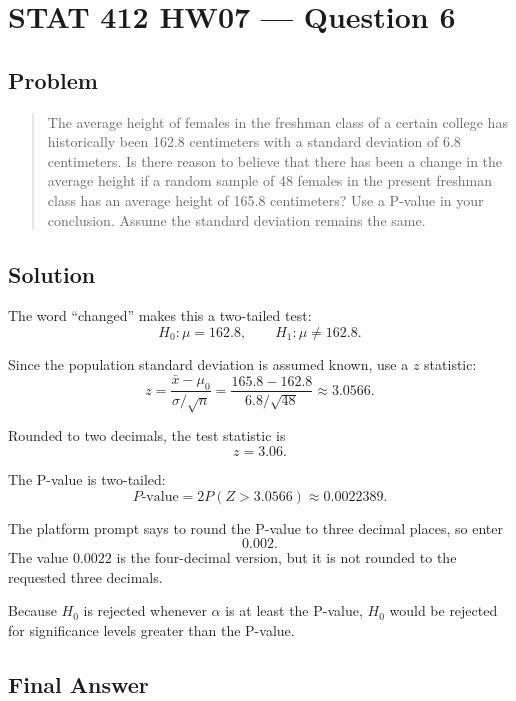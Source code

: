 \documentclass[11pt]{article}
\begin{document}
\section*{STAT 412 HW07 --- Question 6}

\subsection*{Problem}

\begin{quote}
The average height of females in the freshman class of a certain college has historically been 162.8 centimeters with a standard deviation of 6.8 centimeters. Is there reason to believe that there has been a change in the average height if a random sample of 48 females in the present freshman class has an average height of 165.8 centimeters? Use a P-value in your conclusion. Assume the standard deviation remains the same.
\end{quote}

\subsection*{Solution}

The word ``changed'' makes this a two-tailed test:
\[
H_0:\mu=162.8,\qquad H_1:\mu\ne162.8.
\]

Since the population standard deviation is assumed known, use a $z$ statistic:
\[
z=\frac{\bar{x}-\mu_0}{\sigma/\sqrt{n}}
  =\frac{165.8-162.8}{6.8/\sqrt{48}}
  \approx 3.0566.
\]

Rounded to two decimals, the test statistic is
\[
z=3.06.
\]

The P-value is two-tailed:
\[
P\text{-value}=2P(Z>3.0566)\approx 0.0022389.
\]

The platform prompt says to round the P-value to three decimal places, so enter
\[
0.002.
\]
The value $0.0022$ is the four-decimal version, but it is not rounded to the requested three decimals.

Because $H_0$ is rejected whenever $\alpha$ is at least the P-value, $H_0$ would be rejected for significance levels greater than the P-value.

\subsection*{Final Answer}

\end{document}
